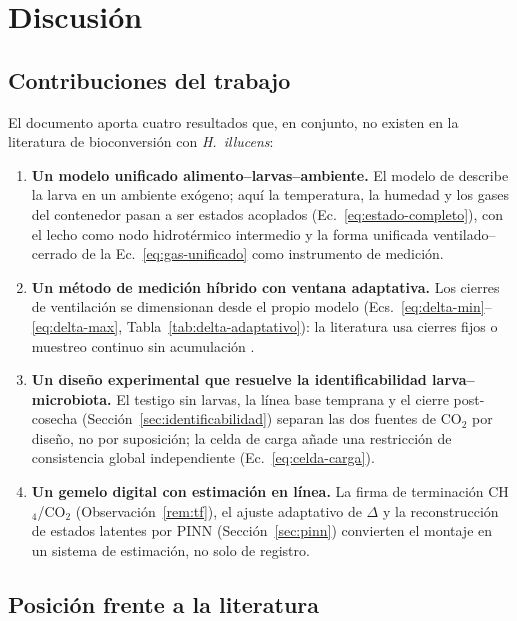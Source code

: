 \section{Discusión}\label{sec:discusion}

\subsection{Contribuciones del trabajo}

El documento aporta cuatro resultados que, en conjunto, no existen en la
literatura de bioconversión con \textit{H.~illucens}:

\begin{enumerate}
  \item \textbf{Un modelo unificado alimento--larvas--ambiente.} El modelo
  de \citet{eriksenDynamicModellingFeed2022} describe la larva en un ambiente
  exógeno; aquí la temperatura, la humedad y los gases del contenedor pasan
  a ser estados acoplados (Ec.~\eqref{eq:estado-completo}), con el lecho como nodo hidrotérmico
  intermedio y la forma unificada ventilado--cerrado de la
  Ec.~\eqref{eq:gas-unificado} como instrumento de medición.
  \item \textbf{Un método de medición híbrido con ventana adaptativa.}
  Los cierres de ventilación se dimensionan desde el propio modelo
  (Ecs.~\eqref{eq:delta-min}--\eqref{eq:delta-max},
  Tabla~\ref{tab:delta-adaptativo}): la literatura usa cierres fijos
  \citep{ermolaevGreenhouseGasEmissions2019} o muestreo continuo sin
  acumulación \citep{parodiBioconversionEfficienciesGreenhouse2020a}.
  \item \textbf{Un diseño experimental que resuelve la identificabilidad
  larva--microbiota.} El testigo sin larvas, la línea base temprana y el
  cierre post-cosecha (Sección~\ref{sec:identificabilidad}) separan las dos
  fuentes de CO$_2$ por diseño, no por suposición; la celda de carga añade
  una restricción de consistencia global independiente
  (Ec.~\eqref{eq:celda-carga}).
  \item \textbf{Un gemelo digital con estimación en línea.} La firma de
  terminación CH$_4$/CO$_2$ (Observación~\ref{rem:tf}), el ajuste adaptativo
  de $\Delta$ y la reconstrucción de estados latentes por PINN
  (Sección~\ref{sec:pinn}) convierten el montaje en un sistema de estimación,
  no solo de registro.
\end{enumerate}

\subsection{Posición frente a la literatura}

